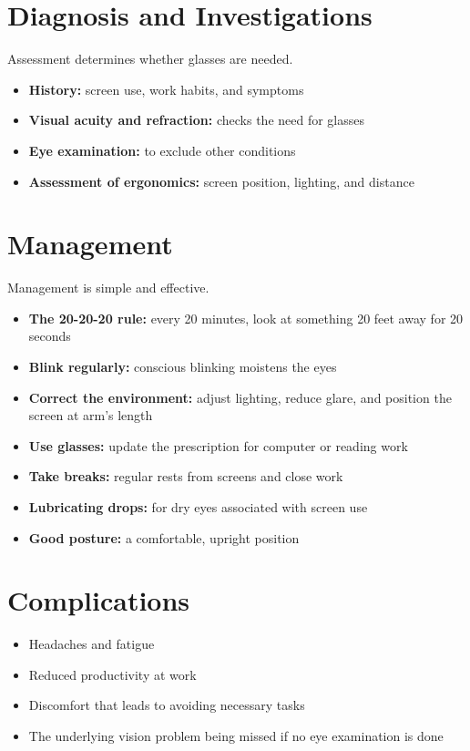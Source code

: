 \section*{Diagnosis and Investigations}
Assessment determines whether glasses are needed.
\begin{itemize}
    \item \textbf{History:} screen use, work habits, and symptoms
    \item \textbf{Visual acuity and refraction:} checks the need for glasses
    \item \textbf{Eye examination:} to exclude other conditions
    \item \textbf{Assessment of ergonomics:} screen position, lighting, and distance
\end{itemize}

\section*{Management}
Management is simple and effective.
\begin{itemize}
    \item \textbf{The 20-20-20 rule:} every 20 minutes, look at something 20 feet away for 20 seconds
    \item \textbf{Blink regularly:} conscious blinking moistens the eyes
    \item \textbf{Correct the environment:} adjust lighting, reduce glare, and position the screen at arm's length
    \item \textbf{Use glasses:} update the prescription for computer or reading work
    \item \textbf{Take breaks:} regular rests from screens and close work
    \item \textbf{Lubricating drops:} for dry eyes associated with screen use
    \item \textbf{Good posture:} a comfortable, upright position
\end{itemize}

\section*{Complications}
\begin{itemize}
    \item Headaches and fatigue
    \item Reduced productivity at work
    \item Discomfort that leads to avoiding necessary tasks
    \item The underlying vision problem being missed if no eye examination is done
\end{itemize}

